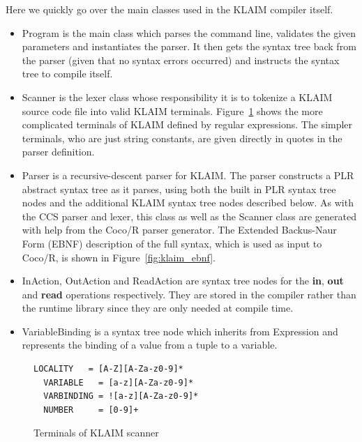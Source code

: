 	Here we quickly go over the main classes used in the KLAIM compiler itself. 	
	\begin{itemize}
	
	\item \textsf{Program} is the main class which parses the command line, 
	validates the given parameters and instantiates the parser. It then gets the 
	syntax tree back from the parser (given that no syntax errors occurred) and 
	instructs the syntax tree to compile itself.
	
	\item \textsf{Scanner} is the lexer class whose responsibility it is to 
	tokenize a KLAIM source code file into valid KLAIM terminals. 
	Figure~\ref{fig:klaimterminals} shows the more complicated terminals of 
	KLAIM defined by regular expressions. The simpler terminals, who are just 
	string constants, are given directly in quotes in the parser definition. 
	
  \item \textsf{Parser} is a recursive-descent parser for KLAIM. The parser 
  constructs a PLR abstract syntax tree as it parses, using both the built in 
  PLR syntax tree nodes and the additional KLAIM syntax tree nodes described 
  below. As with the CCS parser and lexer, this class as well as the 
  \textsf{Scanner} class are generated with help from the Coco/R \cite{cocor} 
  parser generator. The Extended Backus-Naur Form (EBNF) description of the 
  full syntax, which is used as input to Coco/R, is shown in 
  Figure~\ref{fig:klaim_ebnf}.
	
	\item \textsf{InAction, OutAction} and \textsf{ReadAction} are syntax tree 
	nodes for the \textbf{in}, \textbf{out} and \textbf{read} operations 
	respectively. They are stored in the compiler rather than the runtime 
	library since they are only needed at compile time.
	
	\item \textsf{VariableBinding} is a syntax tree node which inherits from 
	\textsf{Expression} and represents the binding of a value from a tuple to a 
	variable.
	
	\end{itemize}
	
\begin{figure}
\label{fig:klaimterminals}
\caption{Terminals of KLAIM scanner}
\lstset{showtabs=false,showspaces=false,showstringspaces=false}
\begin{lstlisting}[frame=trbl,basicstyle=\scriptsize\ttfamily,showtabs=false,showspaces=false]
  LOCALITY   = [A-Z][A-Za-z0-9]*
  VARIABLE   = [a-z][A-Za-z0-9]*
  VARBINDING = ![a-z][A-Za-z0-9]*
  NUMBER     = [0-9]+
  \end{lstlisting}
	\end{figure}
	
